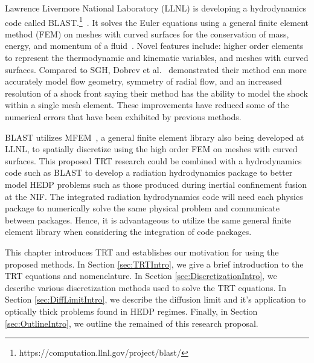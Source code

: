 \documentclass{article}
\begin{document}
Lawrence Livermore National Laboratory (LLNL) is developing a hydrodynamics code called BLAST.\footnote{https://computation.llnl.gov/project/blast/}~\cite{DobrevHOFEMHydro}. It solves the Euler equations using a general finite element method (FEM) on meshes with curved surfaces for the conservation of mass, energy, and momentum of a fluid~\cite{DobrevCurvilinearFEMHydro}. Novel features include: higher order elements to represent the thermodynamic and kinematic variables, and meshes with curved surfaces. Compared to SGH, Dobrev et al.~\cite{DobrevCurvilinearFEMHydro} demonstrated their method can more accurately model flow geometry, symmetry of radial flow, and an increased resolution of a shock front saying their method has the ability to model the shock within a single mesh element. These improvements have reduced some of the numerical errors that have been exhibited by previous methods.

BLAST utilizes MFEM~\cite{MFEM_Web}, a general finite element library also being developed at LLNL, to spatially discretize using the high order FEM on meshes with curved surfaces. This proposed TRT research could be combined with a hydrodynamics code such as BLAST to develop a radiation hydrodynamics package to better model HEDP problems such as those produced during inertial confinement fusion at the NIF. The integrated radiation hydrodynamics code will need each physics package to numerically solve the same physical problem and communicate between packages. Hence, it is advantageous to utilize the same general finite element library when considering the integration of code packages.

This chapter introduces TRT and establishes our motivation for using the proposed methods. In Section \ref{sec:TRTIntro}, we give a brief introduction to the TRT equations and nomenclature. In Section \ref{sec:DiscretizationIntro}, we describe various discretization methods used to solve the TRT equations. In Section \ref{sec:DiffLimitIntro}, we describe the diffusion limit and it's application to optically thick problems found in HEDP regimes. Finally, in Section \ref{sec:OutlineIntro}, we outline the remained of this research proposal.

\end{document}
